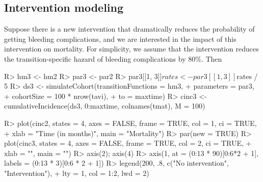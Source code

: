 \subsection{Intervention modeling}
Suppose there is a new intervention that dramatically reduces the probability of getting bleeding complications, and we are interested in the impact of this intervention on mortality. 
For simplicity, we assume that the intervention reduces the transition-specific hazard of bleeding complications by $80\%$. Then 
\begin{Schunk}
\begin{Sinput}
R>   hm3 <- hm2
R>   par3 <- par2
R>   par3[[1, 3]]$rates <- par3[[1, 3]]$rates / 5
R>   ds3 <- simulateCohort(transitionFunctions = hm3, 
+                         parameters = par3, 
+                         cohortSize = 100 * nrow(tavi), 
+                         to = maxtime)
R>   cinc3 <- cumulativeIncidence(ds3, 0:maxtime, colnames(tmat), M = 100)
\end{Sinput}
\end{Schunk}

\begin{Schunk}
\begin{Sinput}
R>   plot(cinc2, states = 4, axes = FALSE, frame = TRUE, col = 1, ci = TRUE, 
+        xlab = "Time (in months)", main = "Mortality")
R>   par(new = TRUE)
R>   plot(cinc3, states = 4, axes = FALSE, frame = TRUE, col = 2, ci = TRUE, 
+        xlab = "", main = "")
R>   axis(2); axis(4)
R>   axis(1, at = (0:13 * 90)[0:6*2 + 1], labels = (0:13 * 3)[0:6 * 2 + 1])
R>   legend(200, .8, c("No intervention", "Intervention"), 
+          lty = 1, col = 1:2, lwd = 2)
\end{Sinput}
\end{Schunk}

